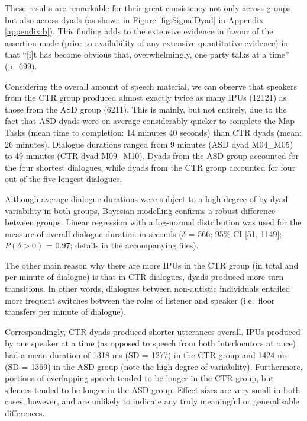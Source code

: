 These results are remarkable for their great consistency not only across groups, but also across dyads (as shown in Figure \ref{fig:SignalDyad} in Appendix \ref{appendix:b}). This finding adds to the extensive evidence in favour of the assertion made (prior to availability of any extensive quantitative evidence) in \citet{sacksSimplestSystematicsOrganization1978} that ``{[}i{]}t has become obvious that, overwhelmingly, one party talks at a time'' (p.~699).

Considering the overall amount of speech material, we can observe that speakers from the CTR group produced almost exactly twice as many IPUs (12121) as those from the ASD group (6211). This is mainly, but not entirely, due to the fact that ASD dyads were on average considerably quicker to complete the Map Tasks (mean time to completion: 14 minutes 40 seconds) than CTR dyads (mean: 26 minutes). Dialogue durations ranged from 9 minutes (ASD dyad M04\_M05) to 49 minutes (CTR dyad M09\_M10). Dyads from the ASD group accounted for the four shortest dialogues, while dyads from the CTR group accounted for four out of the five longest dialogues.

Although average dialogue durations were subject to a high degree of by-dyad variability in both groups, Bayesian modelling confirms a robust difference between groups. Linear regression with a log-normal distribution was used for the measure of overall dialogue duration in seconds (\(\delta\) = 566; 95\% CI {[}51, 1149{]}; \(P(\delta > 0)\) = 0.97; details in the accompanying files).

The other main reason why there are more IPUs in the CTR group (in total and per minute of dialogue) is that in CTR dialogues, dyads produced more turn transitions. In other words, dialogues between non-autistic individuals entailed more frequent switches between the roles of listener and speaker (i.e.~floor transfers per minute of dialogue).

Correspondingly, CTR dyads produced shorter utterances overall. IPUs produced by one speaker at a time (as opposed to speech from both interlocutors at once) had a mean duration of 1318 ms (SD = 1277) in the CTR group and 1424 ms (SD = 1369) in the ASD group (note the high degree of variability). Furthermore, portions of overlapping speech tended to be longer in the CTR group, but silences tended to be longer in the ASD group. Effect sizes are very small in both cases, however, and are unlikely to indicate any truly meaningful or generalisable differences.

